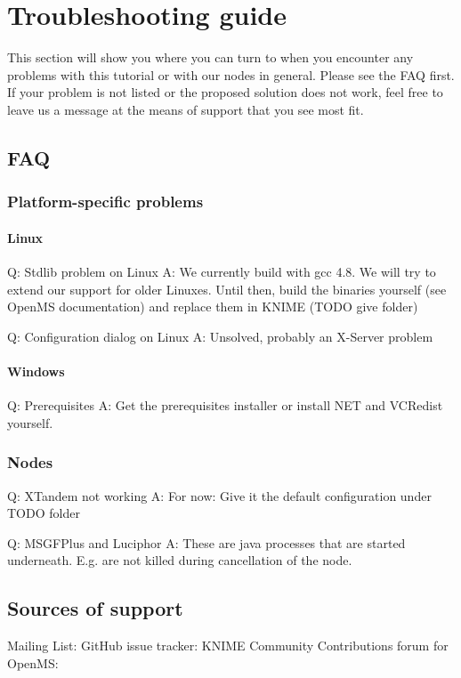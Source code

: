 \section{Troubleshooting guide}
This section will show you where you can turn to when you encounter any problems with this tutorial or with our
nodes in general. Please see the FAQ first. If your problem is not listed or the proposed solution does not work,
feel free to leave us a message at the means of support that you see most fit.

\subsection{FAQ}
\subsubsection{Platform-specific problems}
\paragraph{Linux}
Q: Stdlib problem on Linux
A: We currently build with gcc 4.8. We will try to extend our support for older Linuxes. Until then, build the
binaries yourself (see OpenMS documentation) and replace them in KNIME (TODO give folder)

Q: Configuration dialog on Linux
A: Unsolved, probably an X-Server problem

\paragraph{Windows}
Q: Prerequisites
A: Get the prerequisites installer or install NET and VCRedist yourself.

\subsubsection{Nodes}
Q: XTandem not working
A: For now: Give it the default configuration under TODO folder

Q: MSGFPlus and Luciphor
A: These are java processes that are started underneath. E.g. are not killed during cancellation of the node.

\subsection{Sources of support}
Mailing List:
GitHub issue tracker:
KNIME Community Contributions forum for OpenMS: